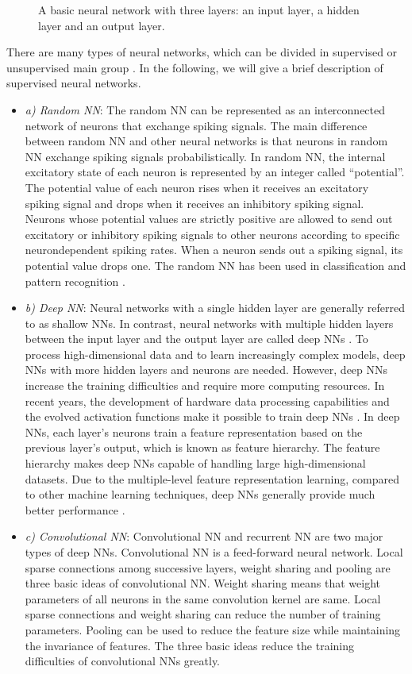 \begin{itemize}
\begin{figure}[tb!]
	\caption{A basic neural network with three layers: an input layer, a hidden layer and an output layer.}
	\label{fig:{NN_base}}
\end{figure}
There are many types of neural networks, which can be divided in supervised or unsupervised main group \cite{Lee2005}. In the following, we will give a brief description of supervised neural networks.
\begin{itemize}
\item[]\textit{a)	Random NN}: The random NN can be represented as an interconnected network of neurons that exchange spiking signals. The main difference between random NN and other neural networks is that neurons in random NN exchange spiking signals probabilistically. In random NN, the internal excitatory state of each neuron is represented by an integer called “potential”. The potential value of each neuron rises when it receives an excitatory spiking signal and drops when it receives an inhibitory spiking signal. Neurons whose potential values are strictly positive are allowed to send out excitatory or inhibitory spiking signals to other neurons according to specific neurondependent spiking rates. When a neuron sends out a spiking signal, its potential value drops one. The random NN has been used in classification and pattern recognition \cite{Timotheou2010}.
\item[]\textit{b)	Deep NN}: Neural networks with a single hidden layer are generally referred to as shallow NNs. In contrast, neural networks with multiple hidden layers between the input layer and the output layer are called deep NNs \cite{LeCun2015, Schmidhuber2015}. To process high-dimensional data and to learn increasingly complex models, deep NNs with more hidden layers and neurons are needed. However, deep NNs increase the training difficulties and require more computing resources. In recent years, the development of hardware data processing capabilities and the evolved activation functions make it possible to train deep NNs \cite{Pandey2014}. In deep NNs, each layer’s neurons train a feature representation based on the previous layer’s output, which is known as feature hierarchy. The feature hierarchy makes deep NNs capable of handling large high-dimensional datasets. Due to the multiple-level feature representation learning, compared to other machine learning techniques, deep NNs generally provide much better performance \cite{Pandey2014}.
\item[]\textit{c)	Convolutional NN}: Convolutional NN and recurrent NN are two major types of deep NNs. Convolutional NN \cite{Krizhevsky2012, Li2018} is a feed-forward neural network. Local sparse connections among successive layers, weight sharing and pooling are three basic ideas of convolutional NN. Weight sharing means that weight parameters of all neurons in the same convolution kernel are same. Local sparse connections and weight sharing can reduce the number of training parameters. Pooling can be used to reduce the feature size while maintaining the invariance of features. The three basic ideas reduce the training difficulties of convolutional NNs greatly.

\end{itemize}
\end{itemize}

